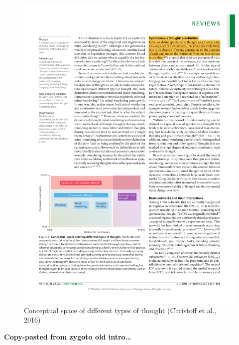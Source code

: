 \documentclass[a4paper,12pt,oneside,oldfontcommands]{memoir}
\begin{document}
\begin{figure}

{\centering \includegraphics[width=0.75\linewidth]{assets/conceptual_space} 

}

\caption{Conceptual space of different types of thought (Christoff et al., 2016)}\label{fig:conceptual}
\end{figure}

\textbf{Copy-pasted from zygoto old intro\ldots{}}
\end{document}
